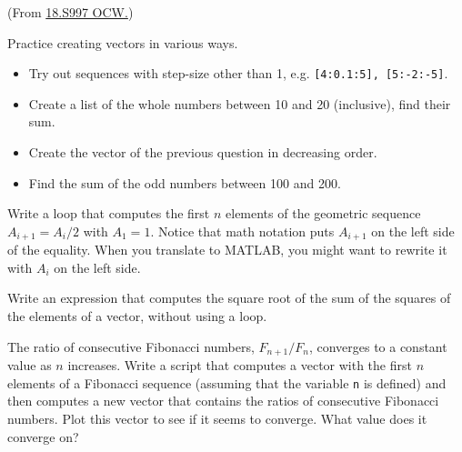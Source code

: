 \documentclass[../../book.tex]{subfiles}
\begin{document}
\begin{ex}
(From \href{https://ocw.mit.edu/courses/18-s997-introduction-to-matlab-programming-fall-2011/pages/the-basics/lists-vectors-and-matrices/}{18.S997 OCW.})

Practice creating vectors in various ways.
\begin{itemize}
\item Try out sequences with step-size other than 1, e.g. \lstinline{[4:0.1:5], [5:-2:-5]}.
\item Create a list of the whole numbers between 10 and 20 (inclusive), find their sum.
\item Create the vector of the previous question in decreasing order.
\item Find the sum of the odd numbers between 100 and 200.
\end{itemize}
\end{ex}

\begin{ex}
Write a loop that computes the first $n$ elements
of the geometric sequence $A_{i+1} = A_i/2$ with $A_1 = 1$.  Notice that
math notation puts $A_{i+1}$ on the left side of the equality.
When you translate to MATLAB, you might want to rewrite it with
$A_{i}$ on the left side.
\end{ex}


\begin{ex}
Write an expression that computes the square root of the sum of the squares of the elements of a vector, without using a loop.
\end{ex}



\begin{ex}
\label{fibratio}

The ratio of consecutive Fibonacci numbers, $F_{n+1}/F_{n}$, converges
to a constant value as $n$ increases.  Write a script that computes
a vector with the first $n$ elements of a Fibonacci sequence (assuming
that the variable \lstinline{n} is defined) and then computes a new
vector that contains the ratios of consecutive Fibonacci numbers.
Plot this vector to see if it seems to converge.  What value does
it converge on?


\end{ex}
\end{document}
